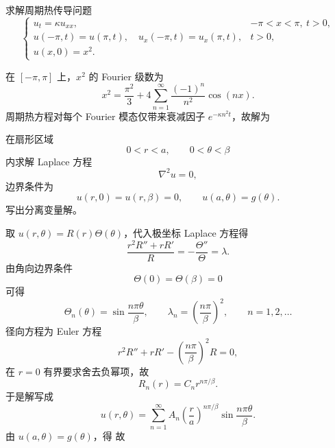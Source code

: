 \begin{question}
求解周期热传导问题
\[
\begin{cases}
 u_t=\kappa u_{xx}, & -\pi<x<\pi,\ t>0,\\
 u(-\pi,t)=u(\pi,t),\quad u_x(-\pi,t)=u_x(\pi,t), & t>0,\\
 u(x,0)=x^2.
\end{cases}
\]
\begin{solution}

在 $[-\pi,\pi]$ 上，$x^2$ 的 Fourier 级数为
\[
x^2=\frac{\pi^2}{3}+4\sum_{n=1}^{\infty}\frac{(-1)^n}{n^2}\cos(nx).
\]
周期热方程对每个 Fourier 模态仅带来衰减因子 $e^{-\kappa n^2t}$，故解为
\end{solution}
\end{question}

\begin{question}
在扇形区域
\[
0<r<a,\qquad 0<\theta<\beta
\]
内求解 Laplace 方程
\[
\nabla^2u=0,
\]
边界条件为
\[
u(r,0)=u(r,\beta)=0,
\qquad
u(a,\theta)=g(\theta).
\]
写出分离变量解。
\begin{solution}

取 $u(r,\theta)=R(r)\Theta(\theta)$，代入极坐标 Laplace 方程得
\[
\frac{r^2R''+rR'}{R}=-\frac{\Theta''}{\Theta}=\lambda.
\]
由角向边界条件
\[
\Theta(0)=\Theta(\beta)=0
\]
可得
\[
\Theta_n(\theta)=\sin\frac{n\pi\theta}{\beta},
\qquad
\lambda_n=\left(\frac{n\pi}{\beta}\right)^2,
\qquad n=1,2,\dots
\]
径向方程为 Euler 方程
\[
r^2R''+rR'-\left(\frac{n\pi}{\beta}\right)^2R=0,
\]
在 $r=0$ 有界要求舍去负幂项，故
\[
R_n(r)=C_n r^{n\pi/\beta}.
\]
于是解写成
\[
u(r,\theta)=\sum_{n=1}^{\infty}A_n\left(\frac{r}{a}\right)^{n\pi/\beta}\sin\frac{n\pi\theta}{\beta}.
\]
由 $u(a,\theta)=g(\theta)$，得
故
\end{solution}
\end{question}


